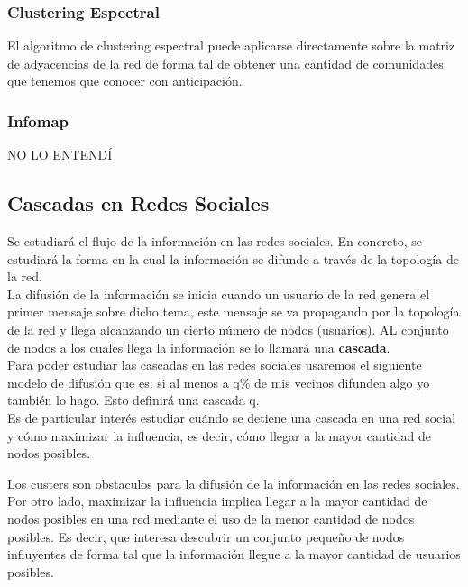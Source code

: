 \documentclass[titlepage,a4paper]{article}
\begin{document}
\subsubsection*{Clustering Espectral}
El algoritmo de clustering espectral puede aplicarse directamente sobre la matriz de adyacencias de la red de forma tal de obtener una cantidad de comunidades que tenemos que conocer con anticipación. 

\subsubsection*{Infomap}
NO LO ENTENDÍ

\subsection*{Cascadas en Redes Sociales}
Se estudiará el flujo de la información en las redes sociales. En concreto, se estudiará la forma en la cual la información se difunde a través de la topología de la red. \\ 

La difusión de la información se inicia cuando un usuario de la red genera el primer mensaje sobre dicho tema, este mensaje se va propagando por la topología de la red y llega alcanzando un cierto número de nodos (usuarios). AL conjunto de nodos a los cuales llega la información se lo llamará una \textbf{cascada}.\\

Para poder estudiar las cascadas en las redes sociales usaremos el siguiente modelo de difusión que es: si al menos a q\% de mis vecinos difunden algo yo también lo hago. Esto definirá una cascada q. \\

Es de particular interés estudiar cuándo se detiene una cascada en una red social y cómo maximizar la influencia, es decir, cómo llegar a la mayor cantidad de nodos posibles. 

Los custers son obstaculos para la difusión de la información en las redes sociales.\\

Por otro lado, maximizar la influencia implica llegar a la mayor cantidad de nodos posibles en una red mediante el uso de la menor cantidad de nodos posibles. Es decir, que interesa descubrir un conjunto pequeño de nodos influyentes de forma tal que la información llegue a la mayor cantidad de usuarios posibles. \\
\end{document}
